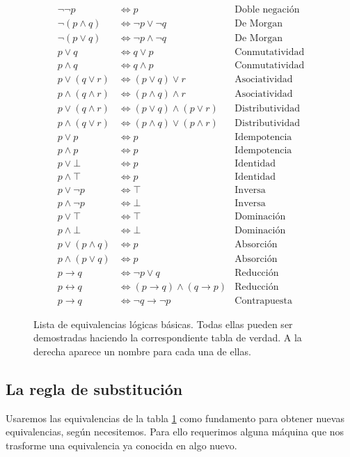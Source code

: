 \documentclass{book}
\theoremstyle{definition}
\begin{document}
\begin{figure}[h]
\begin{align*}
	\neg \neg p &\iff p & \text{Doble negación}\\
	\neg(p \wedge q) &\iff \neg p \vee \neg q & \text{De Morgan}\\
	\neg(p \vee q) &\iff \neg p \wedge \neg q & \text{De Morgan}\\
	p \vee q &\iff q \vee p & \text{Conmutatividad} \\
	p \wedge q & \iff q \wedge p & \text{Conmutatividad}\\
	p \vee (q \vee r) &\iff (p \vee q) \vee r & \text{Asociatividad}\\
	p \wedge (q \wedge r) &\iff (p \wedge q) \wedge r & \text{Asociatividad}\\
	p \vee (q \wedge r) &\iff (p \vee q) \wedge (p \vee r) & \text{Distributividad} \\
	p \wedge (q \vee r) &\iff (p \wedge q) \vee (p \wedge r) & \text{Distributividad}\\
	p \vee p &\iff p & \text{Idempotencia} \\
	p \wedge p &\iff p & \text{Idempotencia}\\
	p \vee \bot &\iff p & \text{Identidad} \\
	p \wedge \top &\iff p & \text{Identidad}\\
	p \vee \neg p &\iff \top & \text{Inversa}\\
	p \wedge \neg p &\iff \bot & \text{Inversa}\\
	p \vee \top &\iff \top & \text{Dominación} \\
	p \wedge \bot &\iff \bot & \text{Dominación} \\
	p \vee (p \wedge q) &\iff p & \text{Absorción} \\
	p \wedge (p \vee q) & \iff p & \text{Absorción}\\
	p \rightarrow q &\iff \neg p \vee q & \text{Reducción}\\
	p \leftrightarrow q &\iff (p \rightarrow q) \wedge (q \rightarrow p) & \text{Reducción}\\
	p \rightarrow q &\iff \neg q \rightarrow \neg p & \text{Contrapuesta}
\end{align*}
\caption{Lista de equivalencias lógicas básicas. Todas ellas pueden ser demostradas haciendo la correspondiente tabla de verdad. A la derecha aparece un nombre para cada una de ellas.}
\label{tb_EquivalenciasLogicas}
\end{figure}

\subsection{La regla de substitución}
Usaremos las equivalencias de la tabla \ref{tb_EquivalenciasLogicas} como fundamento para obtener nuevas equivalencias, según necesitemos.
Para ello requerimos alguna máquina que nos trasforme una equivalencia ya conocida en algo nuevo.
\end{document}
